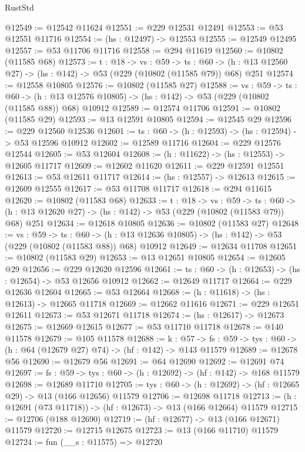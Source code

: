 \begin{lexlean}{RustStd}
\begin{coremodule}
@12549 := @12542 @11624
@12551 := @229 @12531 @12491
@12553 := @53 @12551 @11716
@12554 := (hs : @12497) -> @12553
@12555 := @12549 @12495
@12557 := @53 @11706 @11716
@12558 := @294 @11619
@12560 := @10802 (@11585 @68)
@12573 := {t : @18} ->
  {vs : @59} ->
  {ts : @60} -> (h : @13 @12560 @27) -> (hs : @142) -> @53 (@229 (@10802 (@11585 @79)) @68) @251
@12574 := @12558 @10805
@12576 := @10802 (@11585 @27)
@12588 := {vs : @59} ->
  {ts : @60} ->
  (h : @13 @12576 @10805) -> (hs : @142) -> @53 (@229 (@10802 (@11585 @88)) @68) @10912
@12589 := @12574 @11706
@12591 := @10802 (@11585 @29)
@12593 := @13 @12591 @10805
@12594 := @12545 @29
@12596 := @229 @12560 @12536
@12601 := {ts : @60} -> (h : @12593) -> (hs : @12594) -> @53 @12596 @10912
@12602 := @12589 @11716
@12604 := @229 @12576 @12544
@12605 := @53 @12604
@12608 := (h : @11622) -> (hs : @12553) -> @12605 @11717
@12609 := @12602 @11620
@12611 := @229 @12591 @12551
@12613 := @53 @12611 @11717
@12614 := (hs : @12557) -> @12613
@12615 := @12609 @12555
@12617 := @53 @11708 @11717
@12618 := @294 @11615
@12620 := @10802 (@11583 @68)
@12633 := {t : @18} ->
  {vs : @59} ->
  {ts : @60} -> (h : @13 @12620 @27) -> (hs : @142) -> @53 (@229 (@10802 (@11583 @79)) @68) @251
@12634 := @12618 @10805
@12636 := @10802 (@11583 @27)
@12648 := {vs : @59} ->
  {ts : @60} ->
  (h : @13 @12636 @10805) -> (hs : @142) -> @53 (@229 (@10802 (@11583 @88)) @68) @10912
@12649 := @12634 @11708
@12651 := @10802 (@11583 @29)
@12653 := @13 @12651 @10805
@12654 := @12605 @29
@12656 := @229 @12620 @12596
@12661 := {ts : @60} -> (h : @12653) -> (hs : @12654) -> @53 @12656 @10912
@12662 := @12649 @11717
@12664 := @229 @12636 @12604
@12665 := @53 @12664
@12668 := (h : @11618) -> (hs : @12613) -> @12665 @11718
@12669 := @12662 @11616
@12671 := @229 @12651 @12611
@12673 := @53 @12671 @11718
@12674 := (hs : @12617) -> @12673
@12675 := @12669 @12615
@12677 := @53 @11710 @11718
@12678 := @140 @11578
@12679 := @105 @11578
@12688 := {k : @57} ->
  {fs : @59} -> {tys : @60} -> (h : @64 (@12679 @27) @74) -> (hf : @142) -> @143 @11579
@12689 := @12678 @56
@12690 := @12679 @56
@12691 := @64 @12690
@12692 := @12691 @74
@12697 := {fs : @59} -> {tys : @60} -> (h : @12692) -> (hf : @142) -> @168 @11579
@12698 := @12689 @11710
@12705 := {tys : @60} -> (h : @12692) -> (hf : @12665 @29) -> @13 (@166 @12656) @11579
@12706 := @12698 @11718
@12713 := (h : @12691 (@73 @11718)) -> (hf : @12673) -> @13 (@166 @12664) @11579
@12715 := @12706 (@188 @12690)
@12719 := (hf : @12677) -> @13 (@166 @12671) @11579
@12720 := @12715 @12675
@12723 := @13 (@166 @11710) @11579
@12724 := fun (__s : @11575) => @12720

\end{coremodule}
\end{lexlean}
